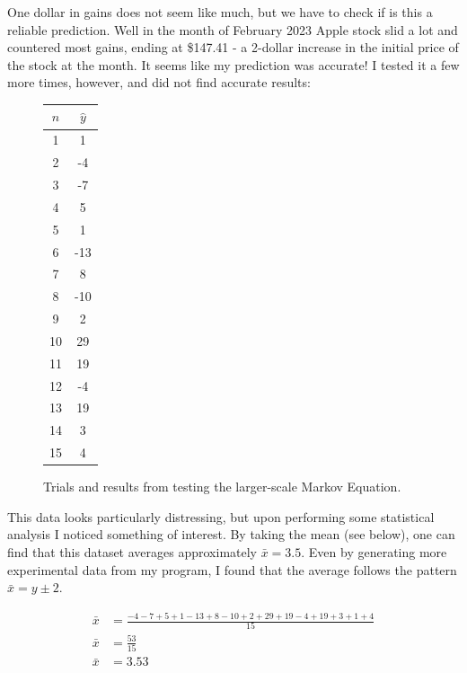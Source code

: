 \documentclass[12pt,final]{article}
\newcommand*\mean[1]{\bar{#1}}
\begin{document}
One dollar in gains does not seem like much, but we have to check if is this a reliable prediction. Well in the month 
of February 2023 Apple stock slid a lot and countered most gains, ending at \$147.41 - a 2-dollar increase in the 
initial price of the stock at the month. It seems like my prediction was accurate! I tested it a few more
times, however, and did not find accurate results:

\begin{figure}[H]
	\begin{center}
	\begin{tabular}{| c | c |}
	\hline 
	$n$ & $\hat{y}$ \\ \hline
	1 & 1 \\ \hline
	2 & -4 \\ \hline
	3 & -7 \\ \hline
	4 & 5 \\ \hline
	5 & 1 \\ \hline
	6 & -13 \\ \hline
	7 & 8 \\ \hline
	8 & -10 \\ \hline
	9 & 2 \\ \hline
	10 & 29 \\ \hline
	11 & 19 \\ \hline
	12 & -4 \\ \hline
	13 & 19 \\ \hline
	14 & 3 \\ \hline
	15 & 4 \\ \hline
	\end{tabular}
	\end{center}
 	\caption{Trials and results from testing the larger-scale Markov Equation.}
	\label{fig:changeinclosetrials}
\end{figure}

This data looks particularly distressing, but upon performing some statistical analysis I noticed something of 
interest. By taking the mean (see below), one can find that this dataset averages approximately $\mean{x}=3.5$.
Even by generating more experimental data from my program, I found that the average follows the pattern $\mean{x}=y\pm2$.

\begin{subequations}
\begin{align}
	\mean{x} &= \frac{-4-7+5+1-13+8-10+2+29+19-4+19+3+1+4}{15} \\
	\mean{x} &= \frac{53}{15} \\
	\mean{x} &= 3.53
\end{align}
	\label{eq:averageofchangeinclosetrials}
\end{subequations}
\end{document}
